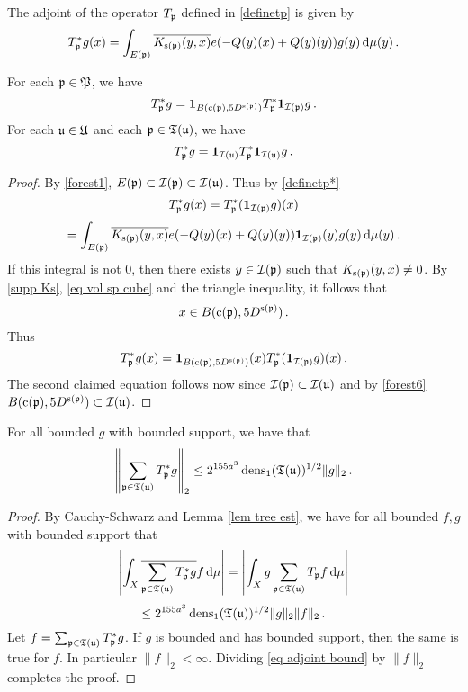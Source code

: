 {The adjoint of the operator $T_{\mathfrak p}$ defined in \eqref{definetp} is given by
\begin{equation}
    \label{definetp*}
    T_{\mathfrak p}^* g(x) = \int_{E(\mathfrak p)} \overline{K_{\mathrm{s}(\mathfrak p)}(y,x)} e(-{Q}(y)(x)+ {Q}(y)(y)) g(y) \, \mathrm{d}\mu(y)\,.
\end{equation}

\begin{lemma}
    \label{lem Tp support adjoint}
    For each $\mathfrak p \in \mathfrak P$, we have
    $$
        T_{\mathfrak p}^* g = \mathbf{1}_{B(\mathrm{c}(\mathfrak p), 5D^{\mathrm{s}(\mathfrak p)})} T_{\mathfrak p}^* \mathbf{1}_{\mathcal{I}(\mathfrak p)} g\,.
    $$
    For each $\mathfrak u \in \mathfrak U$ and each $\mathfrak p \in \mathfrak T(\mathfrak u)$, we have
    $$
        T_{\mathfrak p}^* g = \mathbf{1}_{\mathcal{I}(\mathfrak u)} T_{\mathfrak p}^* \mathbf{1}_{\mathcal{I}(\mathfrak u)} g\,.
    $$
\end{lemma}

\begin{proof}
    By \eqref{forest1}, $E(\mathfrak p) \subset \mathcal{I}(\mathfrak p) \subset \mathcal{I}(\mathfrak u)$. Thus by \eqref{definetp*}
    $$
         T_{\mathfrak p}^* g(x) =  T_{\mathfrak p}^* (\mathbf{1}_{\mathcal{I}(\mathfrak p)} g)(x)
    $$
    $$
        = \int_{E(\mathfrak p)} \overline{K_{\mathrm{s}(\mathfrak p)}(y,x)} e(-{Q}(y)(x) +  {Q}(y)(y)) \mathbf{1}_{\mathcal{I}(\mathfrak p)}(y) g(y) \, \mathrm{d}\mu(y)\,.
    $$
    If this integral is not $0$, then there exists $y \in \mathcal{I}(\mathfrak p)$ such that $K_{\mathrm{s}(\mathfrak p)}(y,x) \ne 0$. By \eqref{supp Ks}, \eqref{eq vol sp cube} and the triangle inequality, it follows that
    \begin{equation*}
        x \in B(\mathrm{c}(\mathfrak p), 5 D^{\mathrm{s}(\mathfrak p)})\, .
    \end{equation*}
    Thus
    $$
        T_{\mathfrak p}^* g(x) = \mathbf{1}_{B(\mathrm{c}(\mathfrak p), 5D^{\mathrm{s}(\mathfrak p)})}(x) T_{\mathfrak p}^* (\mathbf{1}_{\mathcal{I}(\mathfrak p)} g)(x)\,.
    $$
    The second claimed equation follows now since $\mathcal{I}(\mathfrak p) \subset \mathcal{I}(\mathfrak u)$ and by \eqref{forest6} $B(\mathrm{c}(\mathfrak p), 5D^{\mathrm{s}(\mathfrak p)}) \subset \mathcal{I}(\mathfrak u)$.
\end{proof}

\begin{lemma}
    \label{lem tree adjoint bound}
    For all bounded $g$ with bounded support, we have that
    $$
        \left\| \sum_{\mathfrak p \in \mathfrak T(\mathfrak u)} T_{\mathfrak p}^* g\right\|_2 \le 2^{155a^3} \operatorname{\operatorname{dens}}_1(\mathfrak T(\mathfrak u))^{1/2} \|g\|_2\,.
    $$
\end{lemma}

\begin{proof}
    By Cauchy-Schwarz and Lemma \ref{lem tree est}, we have for all bounded $f,g$ with bounded support that
    $$
        \left| \int_X \overline{\sum_{\mathfrak p\in \mathfrak T(\mathfrak u)} T_{\mathfrak p}^* g} f \,\mathrm{d}\mu \right| = \left| \int_X g \sum_{\mathfrak p \in \mathfrak T(\mathfrak u)} T_{\mathfrak p} f \,\mathrm{d}\mu \right|
    $$
    \begin{equation}
        \label{eq adjoint bound}
        \le 2^{155a^3} \operatorname{\operatorname{dens}}_1(\mathfrak T(\mathfrak u))^{1/2} \|g\|_2 \|f\|_2\,.
    \end{equation}
    Let $f = \sum_{\mathfrak p \in \mathfrak T(\mathfrak u)} T_{\mathfrak p}^* g$. If $g$ is bounded and has bounded support, then the same is true for $f$. In particular $\|f\|_2 < \infty$. Dividing \eqref{eq adjoint bound} by $\|f\|_2$ completes the proof.
\end{proof}

}
